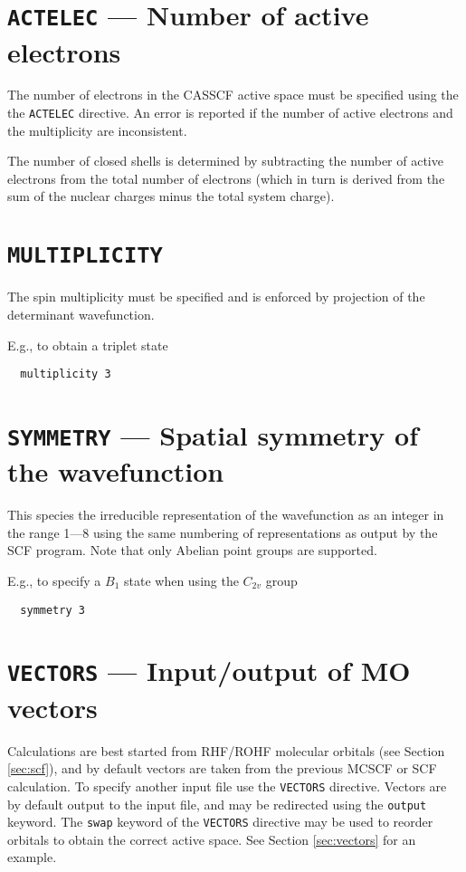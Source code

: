 \section{{\tt ACTELEC} --- Number of active electrons}

The number of electrons in the CASSCF active space must be specified
using the the {\tt ACTELEC} directive.  An error is reported if the
number of active electrons and the multiplicity are inconsistent.

The number of closed shells is determined by subtracting the number
of active electrons from the total number of electrons (which in turn
is derived from the sum of the nuclear charges minus the total system
charge).

\section{{\tt MULTIPLICITY}}

The spin multiplicity must be specified and is enforced by projection
of the determinant wavefunction.

E.g., to obtain a triplet state
\begin{verbatim}
  multiplicity 3
\end{verbatim}

\section{{\tt SYMMETRY} --- Spatial symmetry of the wavefunction}

This species the irreducible representation of the wavefunction as an
integer in the range 1---8 using the same numbering of representations
as output by the SCF program.  Note that only Abelian point groups are
supported.

E.g., to specify a $B_1$ state when using the $C_{2v}$ group
\begin{verbatim}
  symmetry 3
\end{verbatim}

\section{{\tt VECTORS} --- Input/output of MO vectors}
\label{sec:mcscfvectors}

Calculations are best started from RHF/ROHF molecular orbitals (see
Section \ref{sec:scf}), and by default vectors are taken from the
previous MCSCF or SCF calculation.  To specify another input file use
the \verb+VECTORS+ directive.  Vectors are by default output to the
input file, and may be redirected using the \verb+output+ keyword.
The \verb+swap+ keyword of the \verb+VECTORS+ directive may be
used to reorder orbitals to obtain the correct active space.
See Section \ref{sec:vectors} for an example.

